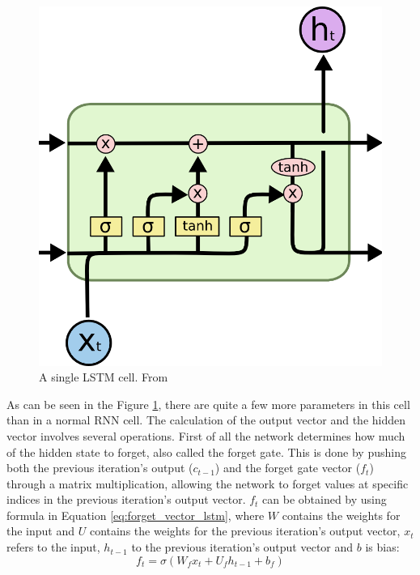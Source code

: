         \begin{figure}[h!]
            \begin{center}
                \includegraphics[scale=0.5]{figs/lstm_cell.png}
            \end{center}
            \caption{A single LSTM cell. From \cite{olah2015understanding}
            \label{fig:lstm_cell}}
        \end{figure}

        As can be seen in the Figure \ref{fig:lstm_cell}, there are quite a few more parameters in this cell than in a normal RNN cell. 
        The calculation of the output vector and the hidden vector involves several operations.
        First of all the network determines how much of the hidden state to forget, also called the forget gate. 
        This is done by pushing both the previous iteration's output ($c_{t-1}$) and the forget gate vector ($f_t$) through a matrix multiplication, allowing the network to forget values at specific indices in the previous iteration's output vector. 
        $f_t$ can be obtained by using formula in Equation \eqref{eq:forget_vector_lstm}, where $W$ contains the weights for the input and $U$ contains the weights for the previous iteration's output vector, $x_t$ refers to the input, $h_{t-1}$ to the previous iteration's output vector and $b$ is bias:
        \begin{equation}
            f_t = \sigma(W_f x_t + U_f h_{t-1} + b_f)
            \label{eq:forget_vector_lstm}
        \end{equation}

